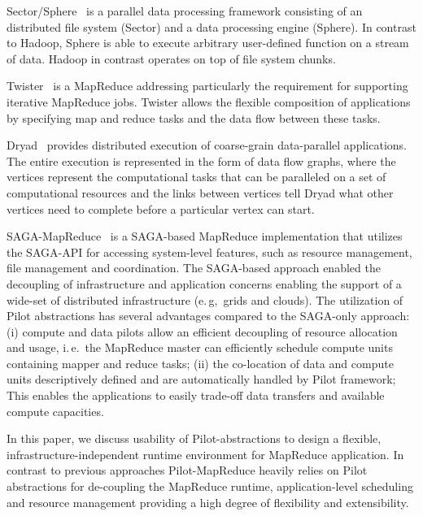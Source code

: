 \documentclass{acm_proc_article-sp}
\newcommand{\pilot}{Pilot\xspace}
\newcommand{\pilotmapreduce}{Pilot-MapReduce\xspace}
\begin{document}
Sector/Sphere~\cite{Gu_Grossman_2009} is a parallel data processing framework
consisting of an distributed file system (Sector) and a data processing engine
(Sphere). In contrast to Hadoop, Sphere is able to execute arbitrary 
user-defined function on a stream of data. Hadoop in contrast operates on top 
of file system chunks.

Twister~\cite{Ekanayake:2010:TRI:1851476.1851593} is a 
MapReduce addressing particularly the requirement for supporting iterative 
MapReduce jobs. Twister allows the flexible composition of applications by 
specifying map and reduce tasks and the data flow between these tasks. 

Dryad~\cite{Isard:2007:DDD:1272998.1273005} provides distributed execution of
coarse-grain data-parallel applications. The entire execution is represented in
the form of data flow graphs, where the vertices represent the computational
tasks that can be paralleled on a set of computational resources and the links
between vertices tell Dryad what other vertices need to complete before a
particular vertex can start.

SAGA-MapReduce~\cite{Sehgal:2011:UAI:1945091.1945329} is a SAGA-based
MapReduce implementation that utilizes the SAGA-API for accessing system-level
features, such as resource management, file management and coordination. The
SAGA-based approach enabled the decoupling of infrastructure and application
concerns enabling the support of a wide-set of distributed infrastructure
(e.\,g,\ grids and clouds). The utilization of Pilot abstractions has several
advantages compared to the SAGA-only approach: (i) compute and data pilots
allow an efficient decoupling of resource allocation and usage, i.\,e.\ the
MapReduce master can efficiently schedule compute units containing mapper and
reduce tasks; (ii) the co-location of data and compute units descriptively
defined and are automatically handled by Pilot framework; This enables the
applications to easily trade-off data transfers and available compute
capacities.


In this paper, we discuss usability of \pilot-abstractions to design a flexible, 
infrastructure-independent runtime environment for MapReduce application. In 
contrast to previous approaches \pilotmapreduce heavily relies on \pilot 
abstractions for de-coupling the MapReduce runtime, application-level scheduling 
and resource management providing a high degree of flexibility and extensibility.



\end{document}
